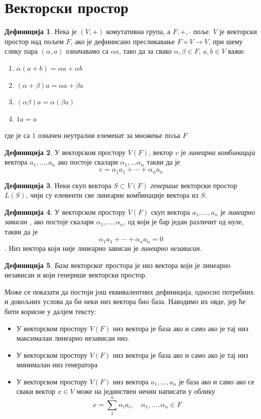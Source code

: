 \documentclass{report}
\theoremstyle{plain}
\theoremstyle{definition}
\newtheorem{defn}{Дефиниција}
\begin{document}
\section{Векторски простор}
\begin{defn}
Нека је $(V, +)$ комутативна група, а $F, +, \cdot$ поље. $V$ је векторски простор над пољем $F$, ако је дефинисано пресликавање $F\times V\to V$, при шему слику пара $(\alpha, a)$ означавамо са $\alpha a$, тако да за свако $\alpha, \beta \in F$, $a, b\in V$ важи:
\begin{enumerate}
\item $\alpha(a+b) = \alpha a+\alpha b$
\item $(\alpha + \beta)a = \alpha a+ \beta a$
\item $(\alpha\beta)a = \alpha(\beta a)$
\item $1a = a$
\end{enumerate}
где је са $1$ означен неутрални елеменат за множење поља $F$
\end{defn}
\begin{defn}
У векторском простору $V(F)$, вектор $v$ је \emph{линеарна комбинација} вектора $a_1, ..., a_n$ ако постоје скалари $\alpha_1, ...\alpha_n$ такви да је $$v = \alpha_1 a_1+\cdots+\alpha_n a_n$$
\end{defn}
\begin{defn}
Неки скуп вектора $S\subset V(F)$ \emph{генерише} векторски простор $L(S)$, чији су елементи све линеарне комбинације вектора из $S$.
\end{defn}
\begin{defn}
У векторском простору $V(F)$ скуп вектора $a_1, ...,a_n$ је \emph{линеарно зависан} , ако постоје скалари $\alpha_1, ...,\alpha_n$, од који је бар један различит од нуле, такви да је $$\alpha_1 a_1 + \cdots+\alpha_n a_n = 0$$. Низ вектора који није линеарно зависан је \emph{линеарно независан}.
\end{defn}
\begin{defn}
\emph{База} векторског простора је низ вектора који је линеарно независан и који генерише векторски простор.
\end{defn}
Може се показати да постоји још еквивалентних дефиниција, односно потребних и довољних услова да би неки низ вектора био база. Наводимо их овде, јер ће бити корисне у далјем тексту:
\begin{itemize}
  \item У векторском простору $V(F)$ низ вектора је база ако и само ако је тај низ максималан линеарно независан низ.
  \item У векторском простору $V(F)$ низ вектора је база ако и само ако је тај низ минималан низ генератора
  \item У векторском простору $V(F)$ низ вектора $a_1, ..., a_n$ је база ако и само ако се сваки вектор $x\in V$ може на јединствен нечин написати у облику $$x = \sum_1^n\alpha_i a_i, \quad \alpha_1, ..., \alpha_n\in F$$
\end{itemize}
\end{document}

